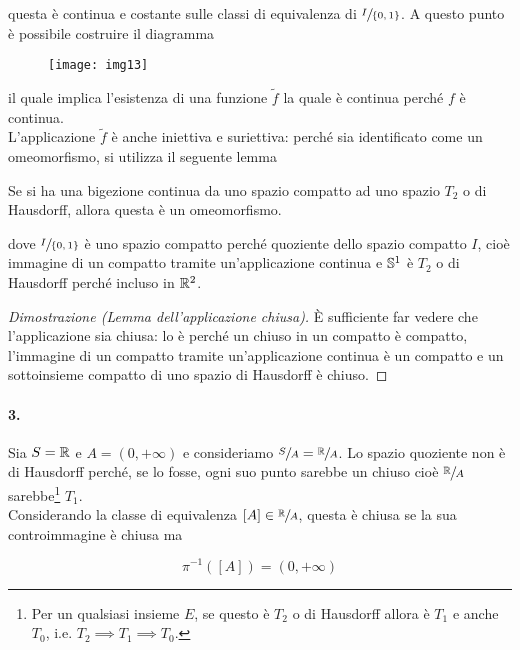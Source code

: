questa è continua e costante sulle classi di equivalenza di $ \sfrac{I}{\{0,1\}} $. A questo punto è possibile costruire il diagramma

\begin{figure}[H]
	\centering
	\texttt{[image: img13]}
\end{figure}

il quale implica l'esistenza di una funzione $ \tilde{f} $ la quale è continua perché $ f $ è continua.\\
L'applicazione $ \tilde{f} $ è anche iniettiva e suriettiva: perché sia identificato come un omeomorfismo, si utilizza il seguente lemma

\begin{lemma}\label{lemma-clos-app}
	Se si ha una bigezione continua da uno spazio compatto ad uno spazio $ T_{2} $ o di Hausdorff, allora questa è un omeomorfismo.
\end{lemma}

dove $ \sfrac{I}{\{0,1\}} $ è uno spazio compatto perché quoziente dello spazio compatto $ I $, cioè immagine di un compatto tramite un'applicazione continua e $ \S^{1} $ è $ T_{2} $ o di Hausdorff perché incluso in $ \R^{2} $.

\begin{proof}[Dimostrazione (Lemma dell'applicazione chiusa)]
	\`{E} sufficiente far vedere che l'applicazione sia chiusa: lo è perché un chiuso in un compatto è compatto, l'immagine di un compatto tramite un'applicazione continua è un compatto e un sottoinsieme compatto di uno spazio di Hausdorff è chiuso.
\end{proof}

\paragraph{3.}

Sia $ S = \R $ e $ A = (0,+\infty) $ e consideriamo $ \sfrac{S}{A} = \sfrac{\R}{A} $. Lo spazio quoziente non è di Hausdorff perché, se lo fosse, ogni suo punto sarebbe un chiuso cioè $ \sfrac{\R}{A} $ sarebbe\footnote{%
	Per un qualsiasi insieme $ E $, se questo è $ T_{2} $ o di Hausdorff allora è $ T_{1} $ e anche $ T_{0} $, i.e. $ T_{2} \implies T_{1} \implies T_{0} $.%
} $ T_{1} $.\\
Considerando la classe di equivalenza $ [A] \in \sfrac{\R}{A} $, questa è chiusa se la sua controimmagine è chiusa ma

\begin{equation}
	\pi^{-1} ([A]) = (0,+\infty)
\end{equation}

